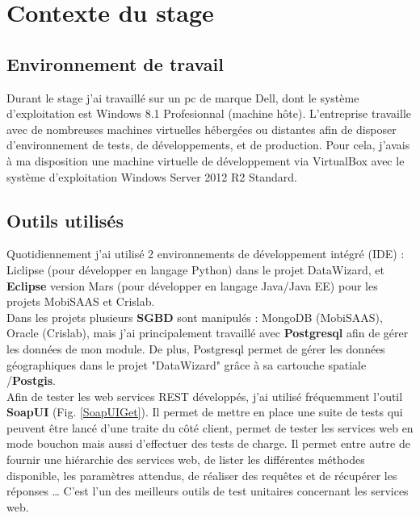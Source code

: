 \chapter{Contexte du stage}
\label{AnalyseConception}

\section{Environnement de travail}

Durant le stage j'ai travaillé sur un pc de marque Dell, dont le système d'exploitation est Windows 8.1 Profesionnal (machine hôte). L'entreprise travaille avec de nombreuses machines virtuelles hébergées ou distantes afin de disposer d'environnement de tests, de développements, et de production. Pour cela, j'avais à ma disposition une machine virtuelle de développement via VirtualBox avec le système d'exploitation Windows Server 2012 R2 Standard. \\

\section{Outils utilisés}

Quotidiennement j'ai utilisé 2 environnements de développement intégré (IDE) : Liclipse (pour développer en langage Python) dans le projet DataWizard, et \textbf{Eclipse} version Mars (pour développer en langage Java/Java EE) pour les projets MobiSAAS et Crislab.\\

Dans les projets plusieurs \textbf{SGBD} sont manipulés : MongoDB (MobiSAAS), Oracle (Crislab), mais j'ai principalement travaillé avec \textbf{Postgresql} afin de gérer les données de mon module. De plus, Postgresql permet de gérer les données géographiques dans le projet "DataWizard" grâce à sa cartouche spatiale /\textbf{Postgis}.\\

Afin de tester les web services REST développés, j'ai utilisé fréquemment l'outil \textbf{SoapUI} (Fig. \ref{SoapUIGet}). Il permet de mettre en place une suite de tests qui peuvent être lancé d'une traite du côté client, permet de tester les services web en mode bouchon mais aussi d'effectuer des tests de charge. Il permet entre autre de fournir une hiérarchie des services web, de lister les différentes méthodes disponible, les paramètres attendus, de réaliser des requêtes et de récupérer les réponses … C'est l'un des meilleurs outils de test unitaires concernant les services web.

